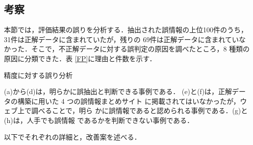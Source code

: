 \documentclass[japanese]{jnlp_1.4}
\begin{document}
\subsection{考察}

本節では，評価結果の誤りを分析する．抽出された誤情報の上位100件のうち，
31件は正解データに含まれていたが，残りの
69件は正解データに含まれていなかった．そこで，不正解データに対する誤判定の原因を調べたところ，8 種類の原因に分類できた．表
\ref{FP}に理由と件数を示す．

\begin{table}[b]
 \caption[評価]{精度に対する誤り分析}
 \label{FP}

\end{table}

(a)から(d)は，明らかに誤抽出と判断できる事例である．
(e)と(f)は，正解データの構築に用いた 4 つの誤情報まとめサイト
に掲載されてはいなかったが，ウェブ上で調べることで，明ら
かに誤情報であると認められる事例である．(g)と(h)は，人手でも誤情報
であるかを判断できない事例である．

以下でそれぞれの詳細と，改善案を述べる．
\pagebreak
\end{document}
